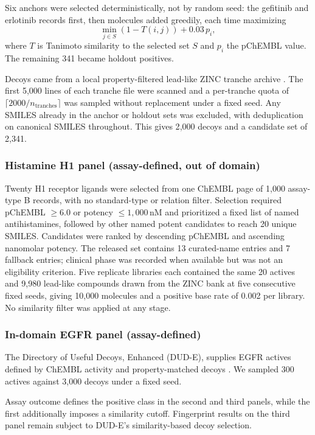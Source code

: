 \documentclass{ieeeaccess}
\begin{document}
Six anchors were selected deterministically, not by random seed: the gefitinib
and erlotinib records first, then molecules added greedily, each time
maximizing
\begin{equation}
\min_{j \in S}\left(1 - T(i, j)\right) + 0.03\,p_i,
\end{equation}
where $T$ is Tanimoto similarity to the selected set $S$ and $p_i$ the pChEMBL
value. The remaining 341 became holdout positives.

Decoys came from a local property-filtered lead-like ZINC tranche archive
\cite{irwin2023zinc22}. The first 5{,}000 lines of each tranche file were
scanned and a per-tranche quota of $\lceil 2000/n_{\text{tranches}}\rceil$ was
sampled without replacement under a fixed seed. Any SMILES already in the anchor
or holdout sets was excluded, with deduplication on canonical SMILES throughout.
This gives 2{,}000 decoys and a candidate set of 2{,}341.

\subsubsection{Histamine H1 panel (assay-defined, out of domain)}
Twenty H1 receptor ligands were selected from one ChEMBL page of 1{,}000
assay-type B records, with no standard-type or relation filter. Selection
required pChEMBL $\geq 6.0$ or potency $\leq 1{,}000$\,nM and prioritized a
fixed list of named antihistamines, followed by other named potent candidates
to reach 20 unique SMILES. Candidates were ranked by descending pChEMBL and
ascending nanomolar potency. The released set contains 13 curated-name entries
and 7 fallback entries; clinical phase was recorded when available but was not
an eligibility criterion. Five replicate libraries each contained the same 20 actives and
9{,}980 lead-like compounds drawn from the ZINC bank at five consecutive fixed
seeds, giving 10{,}000 molecules and a positive base rate of 0.002 per library.
No similarity filter was applied at any stage.

\subsubsection{In-domain EGFR panel (assay-defined)}
The Directory of Useful Decoys, Enhanced (DUD-E), supplies EGFR actives
defined by ChEMBL activity and
property-matched decoys \cite{mysinger2012dude}. We sampled 300 actives against
3{,}000 decoys under a fixed seed.

Assay outcome defines the positive class in the second and third panels, while
the first additionally imposes a similarity cutoff. Fingerprint results on
the third panel remain subject to DUD-E's similarity-based decoy selection.
\end{document}
